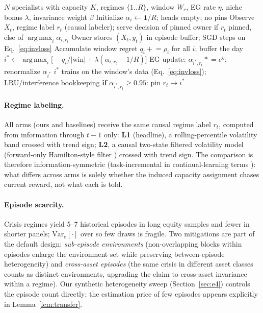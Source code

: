 \documentclass{article}
\newcommand{\Var}{\mathrm{Var}}
\newcommand{\nm}{\textsc{RISP}}
\newcommand{\regret}{\rho}
\DeclareMathOperator*{\argmax}{arg\,max}
\begin{document}
\begin{algorithm}[t]
\caption{\nm{} (batched competition cycle)}
\label{alg:risp}
\begin{algorithmic}[1]
\REQUIRE $N$ specialists with capacity $K$, regimes $\{1..R\}$, window $W_c$,
EG rate $\eta$, niche bonus $\lambda$, invariance weight $\beta$
\STATE Initialize $\alpha_{i} \leftarrow \mathbf{1}/R$; heads empty; no pins
    \STATE Observe $X_t$, regime label $r_t$ (causal labeler); serve decision
    of pinned owner if $r_t$ pinned, else of $\argmax_i \alpha_{i, r_t}$
        \STATE Owner stores $(X_t, y_t)$ in episode buffer; SGD steps on
        Eq.~\eqref{eq:invloss}
    \ELSE
        \STATE Accumulate window regret $q_i \mathrel{+}= \regret_i$ for all
        $i$; buffer the day
            \STATE $i^* \leftarrow \argmax_i \big[-q_i / |\text{win}| +
            \lambda(\alpha_{i, r_t} - 1/R)\big]$
            \STATE EG update: $\alpha_{i^*, r_t} \mathrel{*}= e^{\eta}$;
            renormalize $\alpha_{i^*}$
            \STATE $i^*$ trains on the window's data
            (Eq.~\eqref{eq:invloss}); LRU/interference bookkeeping
            \STATE \textbf{if} $\alpha_{i^*, r_t} \ge 0.95$: pin $r_t \to i^*$
        \ENDIF
    \ENDIF
\ENDFOR
\end{algorithmic}
\end{algorithm}

\paragraph{Regime labeling.} All arms (ours and baselines) receive the same
causal regime label $r_t$, computed from information through $t-1$ only:
\textbf{L1} (headline), a rolling-percentile volatility band crossed with
trend sign; \textbf{L2}, a causal two-state filtered volatility model
(forward-only Hamilton-style filter \citep{hamilton1989new}) crossed with
trend sign. The comparison is therefore information-symmetric
(task-incremental in continual-learning terms \citep{li2026gause}): what
differs across arms is solely whether the induced capacity assignment chases
current reward, not what each is told.

\paragraph{Episode scarcity.} Crisis regimes yield 5--7 historical episodes
in long equity samples and fewer in shorter panels;
$\Var_e[\cdot]$ over so few draws is fragile. Two mitigations are part of
the default design: \emph{sub-episode environments} (non-overlapping blocks
within episodes enlarge the environment set while preserving
between-episode heterogeneity) and \emph{cross-asset episodes} (the same
crisis in different asset classes counts as distinct environments, upgrading
the claim to cross-asset invariance within a regime). Our synthetic
heterogeneity sweep (Section~\ref{sec:e4}) controls the episode count
directly; the estimation price of few episodes appears explicitly in
Lemma~\ref{lem:transfer}.
\end{document}
